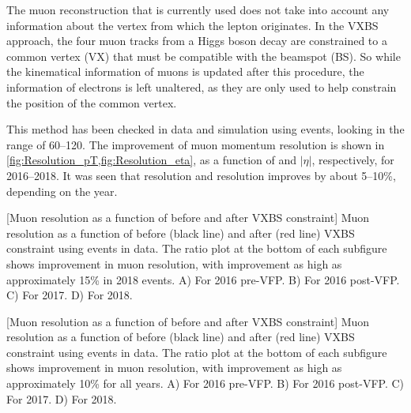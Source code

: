 The muon reconstruction that is currently used does not take into account any information about the vertex from which the lepton originates. %
In the VXBS approach, the four muon tracks from a Higgs boson decay are constrained to a common vertex (VX) that must be compatible with the beamspot (BS). 
So while the kinematical information of muons is updated after this procedure, the information of electrons is left unaltered, as they are only used to help constrain the position of the common vertex.

This method has been checked in data and simulation using \ztomumu events, looking in the \mZ range of 60--120\GeV.
The improvement of muon momentum resolution is shown in \cref{fig:Resolution_pT,fig:Resolution_eta}, as a function of \pT and $|\eta|$, respectively, for 2016--2018.
It was seen that \pT resolution and \mZ resolution improves by about 5--10\%, depending on the year.
\begin{multiFigure}
    \centering
        [Muon \pT resolution as a function of \pT before and after VXBS constraint]
        {Muon \pT resolution as a function of \pT before (black line) and after (red line) VXBS constraint using \ztomumu events in data.
        The ratio plot at the bottom of each subfigure shows improvement in muon \pT resolution, with improvement as high as approximately 15\% in 2018 events.
        \;A) For 2016 pre-VFP.
        \;B) For 2016 post-VFP.
        \;C) For 2017.
        \;D) For 2018.}
    \label{fig:Resolution_pT}
\end{multiFigure}
\begin{multiFigure}
    \centering
        [Muon \pT resolution as a function of \abseta before and after VXBS constraint]
        {Muon \pT resolution as a function of \abseta before (black line) and after (red line) VXBS constraint using \ztomumu events in data.
        The ratio plot at the bottom of each subfigure shows improvement in muon \pT resolution, with improvement as high as approximately 10\% for all years.
        \;A) For 2016 pre-VFP.
        \;B) For 2016 post-VFP.
        \;C) For 2017.
        \;D) For 2018.}
\label{fig:Resolution_eta}
\end{multiFigure}

